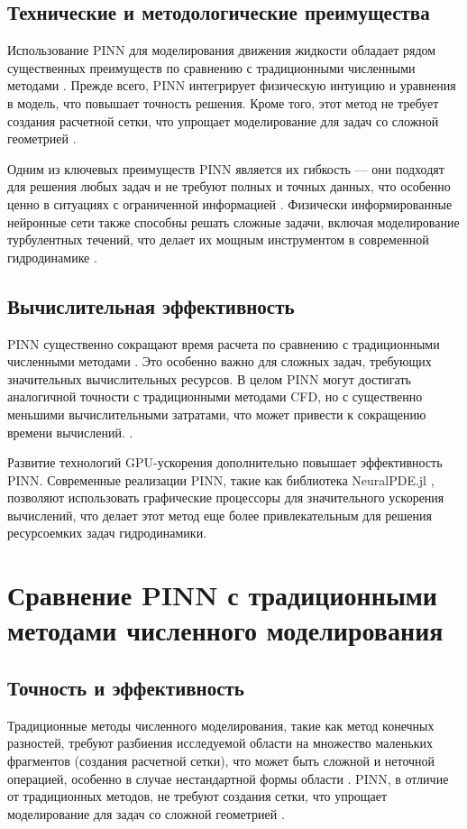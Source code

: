 \subsection{Технические и методологические преимущества}
Использование PINN для моделирования движения жидкости обладает рядом существенных преимуществ по сравнению
с традиционными численными методами \cite{cuomo2022scientific}. Прежде всего, PINN интегрирует физическую
интуицию и уравнения в модель, что повышает точность решения. Кроме того, этот метод не требует создания
расчетной сетки, что упрощает моделирование для задач со сложной геометрией \cite{cai2021physics}.

Одним из ключевых преимуществ PINN является их гибкость –-- они подходят для решения любых задач и
не требуют полных и точных данных, что особенно ценно в ситуациях с ограниченной
информацией \cite{karniadakis2021physics}. Физически информированные нейронные сети также способны решать
сложные задачи, включая моделирование турбулентных течений, что делает их мощным инструментом в современной
гидродинамике \cite{mao2020physics}.

\subsection{Вычислительная эффективность}
PINN существенно сокращают время расчета по сравнению с традиционными численными
методами \cite{jagtap2020conservative}. Это особенно важно для сложных задач, требующих значительных вычислительных
ресурсов. В целом PINN могут достигать аналогичной точности с традиционными методами CFD, но с существенно меньшими
вычислительными затратами, что может привести к сокращению времени вычислений. \cite{Tommaso2024pinn}.

Развитие технологий GPU-ускорения дополнительно повышает эффективность PINN. Современные реализации PINN, такие
как библиотека NeuralPDE.jl \cite{neuralpde2023}, позволяют использовать графические процессоры для значительного
ускорения вычислений, что делает этот метод еще более привлекательным для решения ресурсоемких задач гидродинамики.

\section{Сравнение PINN с традиционными методами численного моделирования}
\subsection{Точность и эффективность}
Традиционные методы численного моделирования, такие как метод конечных разностей, требуют разбиения исследуемой области
на множество маленьких фрагментов (создания расчетной сетки), что может быть сложной и неточной операцией, особенно в
случае нестандартной формы области \cite{ferziger2019computational}. PINN, в отличие от традиционных методов, не требуют
создания сетки, что упрощает моделирование для задач со сложной геометрией \cite{karniadakis2021physics}.

